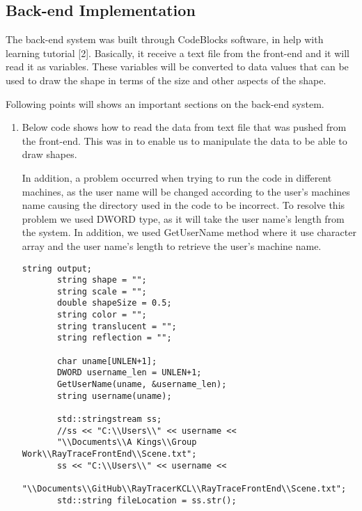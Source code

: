 \documentclass{article}
\begin{document}
 
\subsection{Back-end Implementation}
The back-end system was built through CodeBlocks software, in help with learning tutorial [2]. Basically, it receive a text file from the front-end and it will read it as variables. These variables will be converted to data values that can be used to draw the shape in terms of the size and other aspects of the shape.  

Following points will shows an important sections on the back-end system.

\begin{enumerate}

\item Below code shows how to read the data from text file that was pushed from the front-end. This was in to enable us to manipulate the data to be able to draw shapes.

In addition, a problem occurred when trying to run the code in different machines, as the user name will be changed according to the user’s machines name causing the directory used in the code to be incorrect. To resolve this problem we used DWORD type, as it will take the user name’s length from the system. In addition, we used GetUserName method where it use character array and the user name’s length to retrieve the user’s machine name. 


     \begin{lstlisting}
string output;
       string shape = "";
       string scale = "";
       double shapeSize = 0.5;
       string color = "";
       string translucent = "";
       string reflection = "";

       char uname[UNLEN+1];
       DWORD username_len = UNLEN+1;
       GetUserName(uname, &username_len);
       string username(uname);

       std::stringstream ss;
       //ss << "C:\\Users\\" << username << 
       "\\Documents\\A Kings\\Group Work\\RayTraceFrontEnd\\Scene.txt";
       ss << "C:\\Users\\" << username <<
       "\\Documents\\GitHub\\RayTracerKCL\\RayTraceFrontEnd\\Scene.txt";
       std::string fileLocation = ss.str();


\end{lstlisting}
\end{enumerate}
\end{document}
